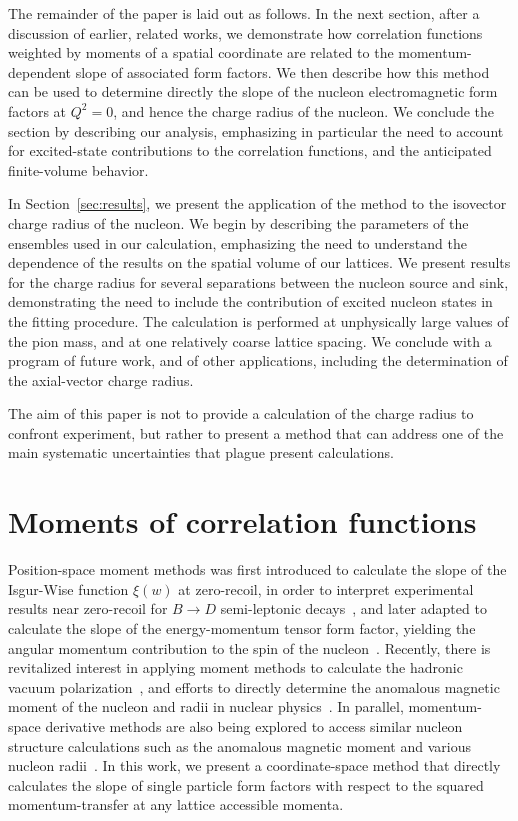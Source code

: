 \documentclass[prd,aps,twocolumn,superscriptaddress,tightenlines,nofootinbib,floatfix,preprintnumbers,10pt]{revtex4-1}
\begin{document}
The remainder of the paper is laid out as follows.  
In the next section, after a discussion of earlier, related works, we demonstrate how correlation functions weighted by moments of a spatial coordinate are related to the momentum-dependent slope of associated form factors.  
We then describe how this method can be used to determine directly the slope of the nucleon electromagnetic form factors at $Q^2 = 0$, and hence the charge radius of the nucleon.  
We conclude the section by describing our analysis, emphasizing in particular the need to account for excited-state contributions to the correlation functions, and the anticipated finite-volume behavior.

In Section~\ref{sec:results}, we present the application of the method to the isovector charge radius of the nucleon.  
We begin by describing the parameters of the ensembles used in our calculation, emphasizing the need to understand the dependence of the results on the spatial volume of our lattices.  
We present results for the charge radius for several separations between the nucleon source and sink, demonstrating the need to include the contribution of excited nucleon states in the fitting procedure.  
The calculation is performed at unphysically large values of the pion mass, and at one relatively coarse
lattice spacing.  
We conclude with a program of future work, and of other applications, including the determination of the axial-vector charge radius.

The aim of this paper is not to provide a calculation of the charge radius to confront experiment, but
rather to present a method that can address one of the main systematic uncertainties that plague present calculations.

\section{Moments of correlation functions}
Position-space moment methods was first introduced to
calculate the slope of the Isgur-Wise function $\xi (w)$ at
zero-recoil, in order to interpret experimental results near
zero-recoil for $B \rightarrow D$ semi-leptonic
decays~\cite{Lellouch:1994zu}, and later adapted to calculate the
slope of the energy-momentum tensor form factor, yielding the angular
momentum contribution to the spin of the
nucleon~\cite{Mathur:1999uf,Gadiyak:2001fe}. Recently, there is
revitalized interest in applying moment methods to calculate the
hadronic vacuum polarization~\cite{Chakraborty:2016mwy,Blum:2016xpd},
and efforts to directly determine the anomalous magnetic moment of the
nucleon and radii in nuclear physics~\cite{Alexandrou:2016rbj}. In
parallel, momentum-space derivative methods are also being explored to
access similar nucleon structure calculations such as the anomalous
magnetic moment and various nucleon
radii~\cite{deDivitiis:2012vs,Tiburzi:2014yra}. In this work, we
present a coordinate-space method that directly calculates the slope
of single particle form factors with respect to the squared
momentum-transfer at any lattice accessible momenta.
\end{document}
